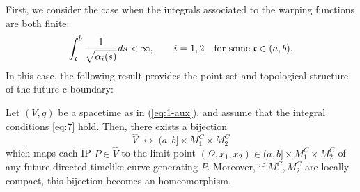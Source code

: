 First, we consider the case when the integrals associated to the warping functions are both finite:
\begin{equation}
  \label{eq:7}
  \int_{\mathfrak{c}}^{b}\frac{1}{\sqrt{\alpha_i(s)}}ds<\infty, \qquad \hbox{$i=1,2$}\quad\hbox{for some $\mathfrak{c}\in (a,b)$.}
\end{equation}
In this case, the following result provides the point set and topological structure of the future c-boundary:
\begin{thm}\label{futurestructurefiniteconditions}
  Let $(V,g)$ be a {\multiwarped} spacetime as in (\ref{eq:1-aux}), and assume that the integral conditions \eqref{eq:7} hold. Then, there exists a bijection
  \begin{equation}
    \label{eq:8}
    \hat{V}\; \leftrightarrow \; (a,b]\times M_1^C\times M_2^C
  \end{equation}
  which maps each IP $P\in \hat{V}$ to the limit point $(\Omega,x_1,x_2)\in (a,b]\times M_1^C\times M_2^C$ of any future-directed timelike curve generating $P$. Moreover, if $M_1^C,M_2^C$ are locally compact, this bijection becomes an homeomorphism.
\end{thm}
